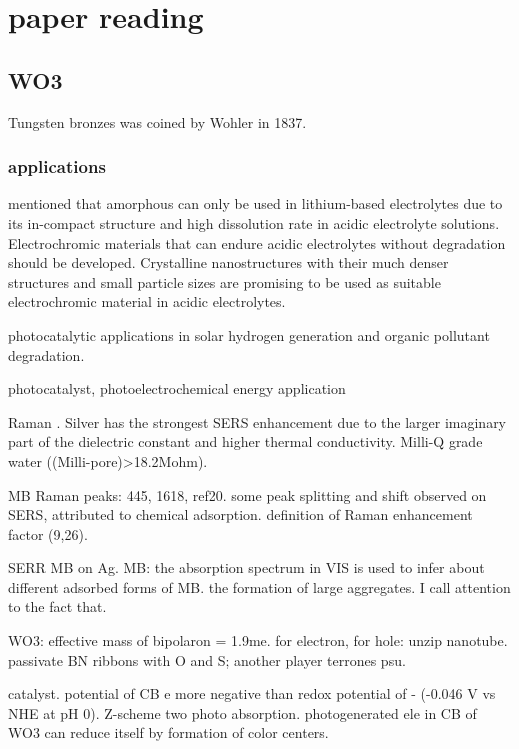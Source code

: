 \chapter{paper reading}



\section{WO3}

Tungsten bronzes was coined by Wohler in 1837.\cite{Deb2008} 



\subsection{applications}


\citeauthor{Wang2009a} mentioned that amorphous  can only be used in lithium-based electrolytes due to its in-compact structure and high dissolution rate in acidic electrolyte solutions. Electrochromic materials that can endure acidic electrolytes without degradation should be developed. Crystalline  nanostructures with their much denser structures and small particle sizes are promising to be used as suitable electrochromic material in acidic electrolytes.

photocatalytic applications in solar hydrogen generation and organic pollutant degradation.

photocatalyst\cite{Macphee2010},
photoelectrochemical energy application \cite{Su2010}

Raman \cite{Xiao2007}. Silver has the strongest SERS enhancement due to the larger imaginary part of the dielectric constant and higher thermal conductivity. Milli-Q grade water ((Milli-pore)\textgreater 18.2Mohm).

MB Raman peaks: 445, 1618, ref20. some peak splitting and shift observed on SERS, attributed to chemical adsorption. definition of Raman enhancement factor (9,26).

SERR MB on Ag. \cite{Nicolai2003}
MB: the absorption spectrum in VIS is used to infer about different adsorbed forms of MB. the formation of large aggregates. I call attention to the fact that.

WO3: effective mass of bipolaron = 1.9me. for electron, for hole:
unzip nanotube. passivate BN ribbons with O and S; another player terrones psu.

 catalyst.\cite{Miyauchi2013}  potential of CB e more negative than redox potential of - (-0.046 V vs NHE at pH 0). Z-scheme two photo absorption. photogenerated ele in CB of WO3 can reduce itself by formation of color centers.

